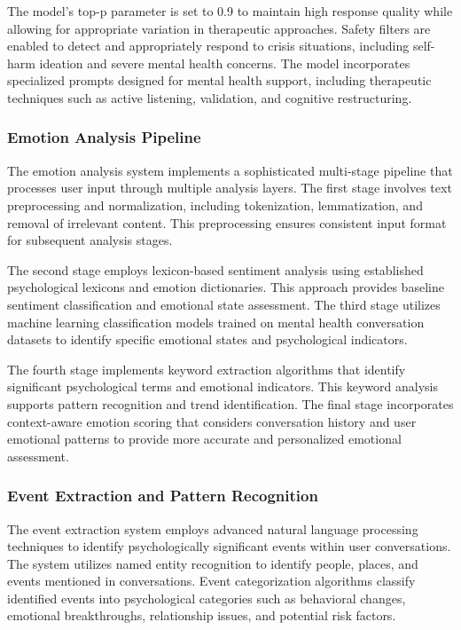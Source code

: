 The model's top-p parameter is set to 0.9 to maintain high response quality while allowing for appropriate variation in therapeutic approaches. Safety filters are enabled to detect and appropriately respond to crisis situations, including self-harm ideation and severe mental health concerns. The model incorporates specialized prompts designed for mental health support, including therapeutic techniques such as active listening, validation, and cognitive restructuring.

\subsubsection{Emotion Analysis Pipeline}

The emotion analysis system implements a sophisticated multi-stage pipeline that processes user input through multiple analysis layers. The first stage involves text preprocessing and normalization, including tokenization, lemmatization, and removal of irrelevant content. This preprocessing ensures consistent input format for subsequent analysis stages.

The second stage employs lexicon-based sentiment analysis using established psychological lexicons and emotion dictionaries. This approach provides baseline sentiment classification and emotional state assessment. The third stage utilizes machine learning classification models trained on mental health conversation datasets to identify specific emotional states and psychological indicators.

The fourth stage implements keyword extraction algorithms that identify significant psychological terms and emotional indicators. This keyword analysis supports pattern recognition and trend identification. The final stage incorporates context-aware emotion scoring that considers conversation history and user emotional patterns to provide more accurate and personalized emotional assessment.

\subsubsection{Event Extraction and Pattern Recognition}

The event extraction system employs advanced natural language processing techniques to identify psychologically significant events within user conversations. The system utilizes named entity recognition to identify people, places, and events mentioned in conversations. Event categorization algorithms classify identified events into psychological categories such as behavioral changes, emotional breakthroughs, relationship issues, and potential risk factors.

